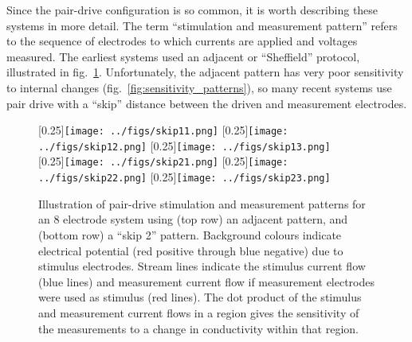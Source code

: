\documentclass[12pt]{article} \usepackage[margin=3cm]{geometry} \usepackage[margin=20pt,font=small,labelfont=bf]{caption}\def\TBLWIDA{35mm}\def\TBLWIDB{95mm}
\newcommand\fref[1]{fig.\ \ref{#1}}
\begin{document}
Since the pair-drive configuration is so common, it is worth
describing these systems in more detail. The term ``stimulation
and measurement pattern'' refers to the sequence of electrodes
to which currents are applied and voltages measured. The earliest
systems used an adjacent or ``Sheffield'' protocol, illustrated
in \fref{fig:stim_meas_patterns}. Unfortunately, the adjacent
pattern has very poor sensitivity to internal changes \cite{Adler2011Adjacent}
(\fref{fig:sensitivity_patterns}), so many recent systems use pair drive
with a ``skip'' distance between the driven and measurement electrodes.

\begin{figure} \centering
   [0.25\columnwidth]{\texttt{[image: ../figs/skip11.png]}}\hfil%
   [0.25\columnwidth]{\texttt{[image: ../figs/skip12.png]}}\hfil%
   [0.25\columnwidth]{\texttt{[image: ../figs/skip13.png]}}\\
   [0.25\columnwidth]{\texttt{[image: ../figs/skip21.png]}}\hfil
   [0.25\columnwidth]{\texttt{[image: ../figs/skip22.png]}}\hfil
   [0.25\columnwidth]{\texttt{[image: ../figs/skip23.png]}}\\
\caption{%
Illustration of pair-drive stimulation and measurement patterns for an 8
   electrode system using (top row) an adjacent pattern, and (bottom row) a
   ``skip 2'' pattern. Background colours indicate electrical potential (red positive through blue negative)
   due to stimulus electrodes. Stream lines indicate the stimulus current flow
   (blue lines) and measurement current flow if measurement electrodes were
   used as stimulus (red lines). The dot product of the stimulus and
   measurement current flows in a region gives the sensitivity of the measurements
   to a change in conductivity within that region.
}
\label{fig:stim_meas_patterns}
\end{figure}
\end{document}
